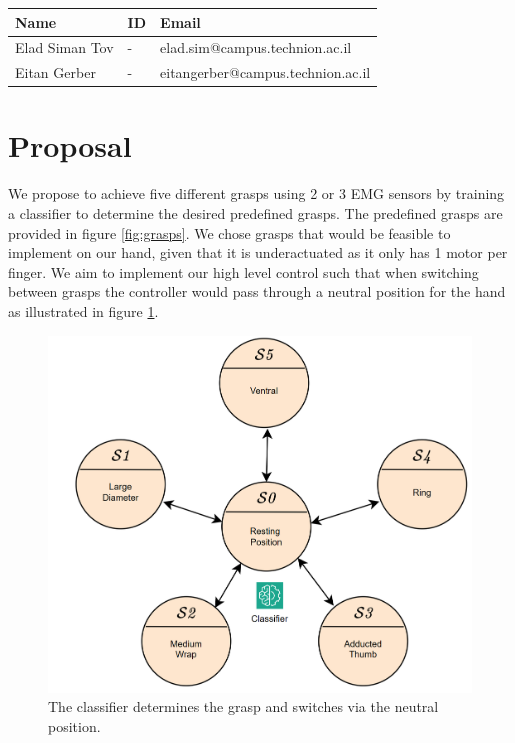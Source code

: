 \documentclass[10pt]{article}
\begin{document}
\begin{table}[h]
    \centering
    \begin{tabular}{l l l}
        \hline
        Name & ID & Email \\
        \hline
        Elad Siman Tov & - & elad.sim@campus.technion.ac.il \\
        \hline
        Eitan Gerber & - & eitangerber@campus.technion.ac.il \\
        \hline
    \end{tabular}
    \label{tab:personal_info}
\end{table}

\section*{Proposal}
We propose to achieve five different grasps using 2 or 3 EMG sensors by training a classifier to determine the desired predefined grasps. The predefined grasps are provided in figure \ref{fig:grasps}. We chose grasps that would be feasible to implement on our hand, given that it is underactuated as it only has 1 motor per finger. We aim to implement our high level control such that when switching between grasps the controller would pass through a neutral position for the hand as illustrated in figure \ref{fig:classifier}.

\begin{figure}[H]
    \centering
    \includegraphics[width=0.7\linewidth]{Final Project/classifier.png}
    \caption{The classifier determines the grasp and switches via the neutral position.}
    \label{fig:classifier}
\end{figure}
\end{document}
